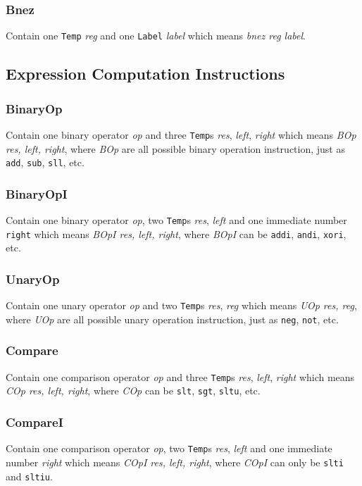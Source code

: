 \documentclass[journal]{IEEEtran}
\begin{document}
\subsubsection{Bnez} 
Contain one \texttt{Temp} \textit{reg} and one \texttt{Label} \textit{label} which means \textit{bnez reg label}.

\subsection{Expression Computation Instructions}

\subsubsection{BinaryOp}
Contain one binary operator \textit{op} and three \texttt{Temp}s \textit{res}, \textit{left}, \textit{right} which means \textit{BOp res, left, right}, where \textit{BOp} are all possible binary operation instruction, just as \texttt{add}, \texttt{sub}, \texttt{sll}, etc.

\subsubsection{BinaryOpI}
Contain one binary operator \textit{op}, two \texttt{Temp}s \textit{res}, \textit{left} and one immediate number \texttt{right} which means \textit{BOpI res, left, right}, where \textit{BOpI} can be \texttt{addi}, \texttt{andi}, \texttt{xori}, etc.

\subsubsection{UnaryOp}
Contain one unary operator \textit{op} and two \texttt{Temp}s \textit{res}, \textit{reg} which means \textit{UOp res, reg}, where \textit{UOp} are all possible unary operation instruction, just as \texttt{neg}, \texttt{not}, etc.

\subsubsection{Compare}
Contain one comparison operator \textit{op} and three \texttt{Temp}s \textit{res}, \textit{left}, \textit{right} which means \textit{COp res, left, right}, where \textit{COp} can be \texttt{slt}, \texttt{sgt}, \texttt{sltu}, etc.

\subsubsection{CompareI}
Contain one comparison operator \textit{op}, two \texttt{Temp}s \textit{res}, \textit{left} and one immediate number \textit{right} which means \textit{COpI res, left, right}, where \textit{COpI} can only be \texttt{slti} and \texttt{sltiu}.
\end{document}
